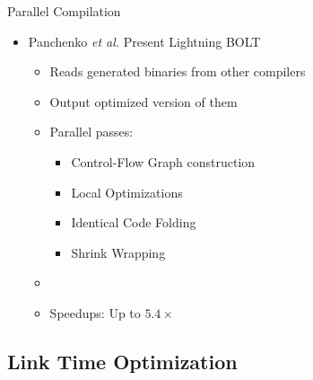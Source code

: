 \begin{frame}{Parallel Compilation}
\begin{itemize}
    \item Panchenko \textit{et al.} \cite{panchenko2021lightning} Present Lightning BOLT
    \begin{itemize}
        \item Reads generated binaries from other compilers
        \item Output optimized version of them
        \item Parallel passes:
        \begin{itemize}
            \item Control-Flow Graph construction
            \item Local Optimizations
            \item Identical Code Folding
            \item Shrink Wrapping
        \end{itemize}
        \item[]
        \item Speedups: Up to $5.4\times$
    \end{itemize}
\end{itemize}
\end{frame}

\subsection{Link Time Optimization}

